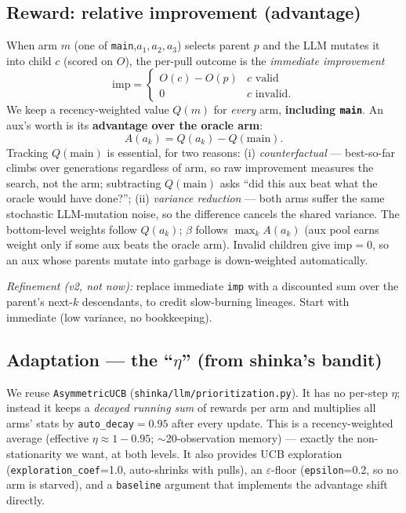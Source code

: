\documentclass[11pt]{article}
\newcommand{\code}[1]{\texttt{\small #1}}
\begin{document}
\subsection{Reward: relative improvement (advantage)}
When arm $m$ (one of \code{main},$a_1,a_2,a_3$) selects parent $p$ and the LLM mutates it into child
$c$ (scored on $O$), the per-pull outcome is the \emph{immediate improvement}
\[
 \text{imp} = \begin{cases} O(c)-O(p) & c \text{ valid}\\ 0 & c \text{ invalid.}\end{cases}
\]
We keep a recency-weighted value $Q(m)$ for \emph{every} arm, \textbf{including \code{main}}. An aux's
worth is its \textbf{advantage over the oracle arm}:
\[
 A(a_k) = Q(a_k) - Q(\text{main}).
\]
Tracking $Q(\text{main})$ is essential, for two reasons: (i) \emph{counterfactual} --- best-so-far
climbs over generations regardless of arm, so raw improvement measures the search, not the arm;
subtracting $Q(\text{main})$ asks ``did this aux beat what the oracle would have done?''; (ii)
\emph{variance reduction} --- both arms suffer the same stochastic LLM-mutation noise, so the
difference cancels the shared variance. The bottom-level weights follow $Q(a_k)$; $\beta$ follows
$\max_k A(a_k)$ (aux pool earns weight only if some aux beats the oracle arm). Invalid children give
$\text{imp}=0$, so an aux whose parents mutate into garbage is down-weighted automatically.

\emph{Refinement (v2, not now):} replace immediate \code{imp} with a discounted sum over the parent's
next-$k$ descendants, to credit slow-burning lineages. Start with immediate (low variance, no
bookkeeping).

\subsection{Adaptation --- the ``$\eta$'' (from shinka's bandit)}
We reuse \code{AsymmetricUCB} (\code{shinka/llm/prioritization.py}). It has no per-step $\eta$;
instead it keeps a \emph{decayed running sum} of rewards per arm and multiplies all arms' stats by
\code{auto\_decay}$=0.95$ after every update. This is a recency-weighted average (effective
$\eta\approx 1-0.95$; $\sim$20-observation memory) --- exactly the non-stationarity we want, at both
levels. It also provides UCB exploration (\code{exploration\_coef}=1.0, auto-shrinks with pulls), an
$\varepsilon$-floor (\code{epsilon}=0.2, so no arm is starved), and a \code{baseline} argument that
implements the advantage shift directly.
\end{document}
